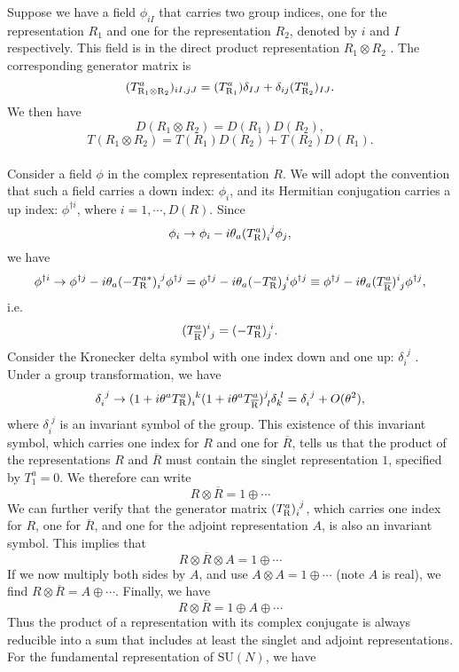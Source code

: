 \noindent
Suppose we have a field $\phi_{iI}$ that carries two group indices, one for the representation $R_1$ and one for the representation $R_2$, denoted by $i$ and $I$ respectively.
This field is in the direct product representation $R_1 \otimes R_2$ . The corresponding generator matrix is
\[(T^a_{\rm R_1 \otimes R_2})_{iI,jJ} = (T^a_{\rm R_1})\delta_{IJ} + \delta_{ij}(T^a_{\rm R_2})_{IJ}.\]
We then have
\[D(R_1\otimes R_2) = D(R_1)D(R_2),\]
\[T(R_1\otimes R_2) = T(R_1)D(R_2) + T(R_2)D(R_1).\]
\\
Consider a field $\phi$ in the complex representation $R$. We will adopt the convention that such a field carries a
down index: $\phi_i$, and its Hermitian conjugation carries a up index: $\phi^{\dagger i}$, where $i = 1,\cdots,D(R)$.
Since
\[\phi_i \to \phi_i - i\theta_a (T^a_{\rm R})_{i}^{\phantom{i}j}\phi_j ,\]
we have
\[\phi^{\dagger i} \to \phi^{\dagger j} - i\theta_a (-T^{a*}_{\rm R})_{i}^{\phantom{i}j}\phi^{\dagger j} = \phi^{\dagger j} - i\theta_a (-T^{a}_{\rm R})_{j}^{\phantom{i}i}\phi^{\dagger j} \equiv \phi^{\dagger j} - i\theta_a (T^{a}_{\rm \overline{R}})^{i}_{\phantom{i}j}\phi^{\dagger j},\]
i.e.
\[(T^{a}_{\rm \overline{R}})^{i}_{\phantom{i}j} = (-T^{a}_{\rm R})_{j}^{\phantom{i}i}.\]
Consider the Kronecker delta symbol with one index down and one up: $\delta_i^{\phantom{i}j}$ . Under a group transformation, we have
\[\delta_i^{\phantom{i}j} \to (1+i\theta^a T^a_{\rm R})_{i}^{\phantom{i}k} (1+i\theta^a T^a_{\rm \overline{R}})^{j}_{\phantom{i}l}\delta_k^{\phantom{i}l} = \delta_i^{\phantom{i}j} + O(\theta^2),\]
where $\delta_i^{\phantom{i}j}$ is an invariant symbol of the group. This existence of this invariant symbol, which carries one index for $R$ and one for $\overline{R}$, tells us that the product of the representations $R$ and $\overline{R}$ must contain the singlet representation $1$, specified by $T_1^a = 0$. We therefore can write
\[R \otimes \overline{R} = 1 \oplus \cdots\]
We can further verify that the generator matrix $(T_{\rm R}^a)_i^{\phantom{i}j}$, which carries one index for $R$, one for $\overline{R}$, and one for the adjoint representation $A$, is also an invariant symbol.
This implies that
\[R \otimes \overline{R} \otimes A = 1 \oplus \cdots\]
If we now multiply both sides by $A$, and use $A \otimes A = 1 \oplus \cdots$ (note $A$ is real), we find $R \otimes \overline{R} = A \oplus \cdots$. Finally, we have
\[R \otimes \overline{R} = 1 \oplus A \oplus \cdots\]
Thus the product of a representation with its complex conjugate is always reducible into a sum that includes at least the singlet and adjoint representations. For the fundamental representation of $\mathrm{SU}(N)$, we have
